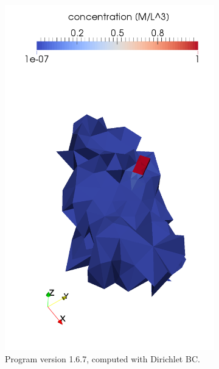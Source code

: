 \begin{figure}[!h]
    \centering
    \begin{subfigure}[b]{0.3\textwidth}
        \centering
        \includegraphics[width=\textwidth]{tests_graphics/transport_end_167o.pdf}
        \caption{Program version 1.6.7, computed with Dirichlet BC.}
        \label{fig:bench_mel3a}
    \end{subfigure}
    ~
    \begin{subfigure}[b]{0.3\textwidth}
        \centering

\end{subfigure}
\end{figure}
